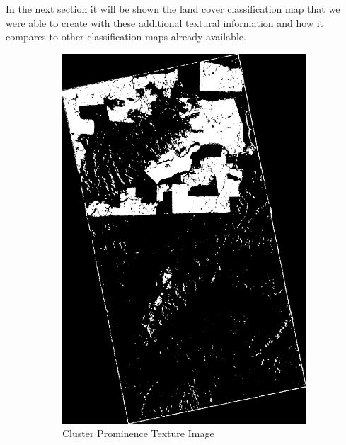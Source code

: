 In the next section it will be shown the land cover classification map that we were able to create with these additional textural information and how it compares to other classification maps already available.
\begin{figure}
    \centering
    \begin{subfigure}[b]{0.4\linewidth}
      \includegraphics[width=\linewidth]{Cap3-Results/sum_and_diff_textures/cluster_prominenceimage.png}
       \caption{Cluster Prominence Texture Image}
    \end{subfigure}
    \centering
    \begin{subfigure}[b]{0.4\linewidth}

\end{subfigure}
\end{figure}
